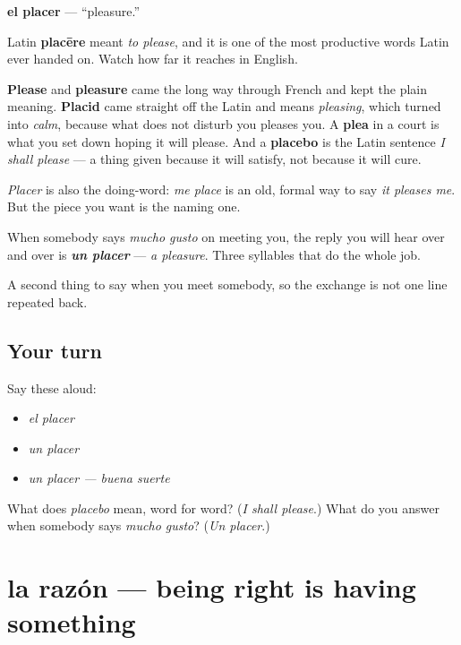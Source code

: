 \begin{cousinweb}
\textbf{el placer} — \textquotedblleft{}pleasure.\textquotedblright{}

Latin \textbf{placēre} meant \emph{to please}, and it is one of the most productive words Latin ever handed on. Watch how far it reaches in English.

\textbf{Please} and \textbf{pleasure} came the long way through French and kept the plain meaning. \textbf{Placid} came straight off the Latin and means \emph{pleasing}, which turned into \emph{calm}, because what does not disturb you pleases you. A \textbf{plea} in a court is what you set down hoping it will please. And a \textbf{placebo} is the Latin sentence \emph{I shall please} — a thing given because it will satisfy, not because it will cure.

\emph{Placer} is also the doing-word: \emph{me place} is an old, formal way to say \emph{it pleases me}. But the piece you want is the naming one.

When somebody says \emph{mucho gusto} on meeting you, the reply you will hear over and over is \emph{\textbf{un placer}} — \emph{a pleasure}. Three syllables that do the whole job.
\end{cousinweb}

\begin{grammarlens}[title={What you've built}]
A second thing to say when you meet somebody, so the exchange is not one line repeated back.
\end{grammarlens}

\subsection*{Your turn}
Say these aloud:

\begin{itemize}
\raggedright
  \item \emph{el placer}
  \item \emph{un placer}
  \item \emph{un placer — buena suerte}
\end{itemize}

\begin{tcolorbox}[breakable,colback=teal!4,colframe=teal!35!black,title={Before you move on}]
What does \emph{placebo} mean, word for word? (\emph{I shall please}.) What do you answer when somebody says \emph{mucho gusto}? (\emph{Un placer}.)
\end{tcolorbox}
\section[la razón]{la razón — being right is having something}

